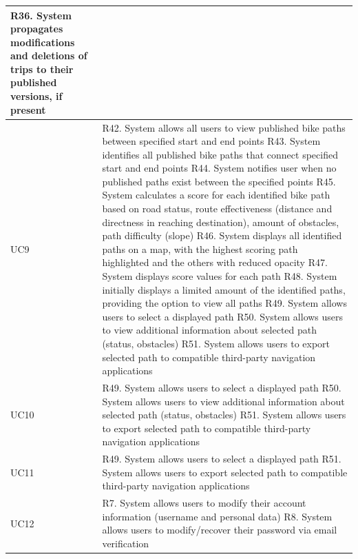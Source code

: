 \begin{longtable}{|p{3cm}|p{12cm}|}
   R36. System propagates modifications and deletions of trips to their published versions, if present \\ \hline
   UC9 & 
   R42. System allows all users to view published bike paths between specified start and end points \newline 
   R43. System identifies all published bike paths that connect specified start and end points \newline 
   R44. System notifies user when no published paths exist between the specified points \newline 
   R45. System calculates a score for each identified bike path based on road status, route effectiveness (distance and directness in reaching destination), amount of obstacles, path difficulty (slope) \newline 
   R46. System displays all identified paths on a map, with the highest scoring path highlighted and the others with reduced opacity \newline 
   R47. System displays score values for each path \newline 
   R48. System initially displays a limited amount of the identified paths, providing the option to view all paths \newline 
   R49. System allows users to select a displayed path \newline 
   R50. System allows users to view additional information about selected path (status, obstacles) \newline 
   R51. System allows users to export selected path to compatible third-party navigation applications \\ \hline
   UC10 & 
   R49. System allows users to select a displayed path \newline 
   R50. System allows users to view additional information about selected path (status, obstacles) \newline 
   R51. System allows users to export selected path to compatible third-party navigation applications \\ \hline
   UC11 & 
   R49. System allows users to select a displayed path \newline 
   R51. System allows users to export selected path to compatible third-party navigation applications \\ \hline
   UC12 & 
   R7. System allows users to modify their account information (username and personal data) \newline 
   R8. System allows users to modify/recover their password via email verification \\ \hline

\end{longtable}
